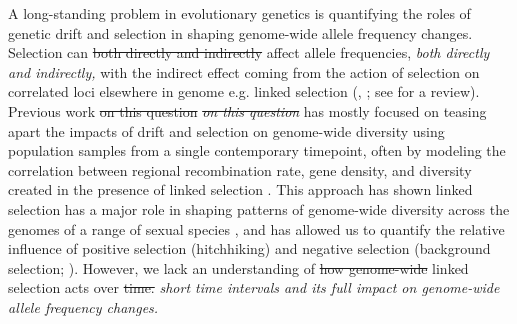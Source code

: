 \documentclass[11pt]{article}
\newcommand{\vb}[1]{{\it \color{blue} #1}}
\newcommand{\vbout}[1]{{\it \color{blue} \sout{#1}}}
\providecommand{\DIFaddtex}[1]{{\protect\color{blue}\uwave{#1}}} %
\providecommand{\DIFdeltex}[1]{{\protect\color{red}\sout{#1}}}                      %
\providecommand{\DIFaddbegin}{} %
\providecommand{\DIFaddend}{} %
\providecommand{\DIFdelbegin}{} %
\providecommand{\DIFdelend}{} %
\providecommand{\DIFadd}[1]{\texorpdfstring{\DIFaddtex{#1}}{#1}} %
\providecommand{\DIFdel}[1]{\texorpdfstring{\DIFdeltex{#1}}{}} %
\begin{document}
A long-standing problem in evolutionary genetics is quantifying the roles of
genetic drift and selection in shaping genome-wide allele frequency changes.
Selection can \DIFdelbegin \DIFdel{both directly and indirectly }\DIFdelend affect allele frequencies, \DIFaddbegin \vb{both directly and indirectly,}
\DIFaddend with the indirect effect coming from the action of selection on correlated
loci elsewhere in genome e.g. linked selection (\cite{Maynard_Smith1974-lc},
\cite{Charlesworth1993-gb,Nordborg1996-nq}; see \cite{Barton2000-zg} for a
review). Previous work \DIFdelbegin \DIFdel{on this question }\DIFdelend \DIFaddbegin \vbout{on this question} \DIFaddend has mostly focused on teasing
apart the impacts of drift and selection on genome-wide diversity using
population samples from a single contemporary timepoint, often by modeling the
correlation between regional recombination rate, gene density, and diversity
created in the presence of linked selection
\parencite{Cutter2013-ba,Sella2009-nx}. This approach has shown linked
selection has a major role in shaping patterns of genome-wide diversity across
the genomes of a range of sexual species
\parencite{Macpherson2007-qt,Andolfatto2007-uy,Begun2007-bg,Beissinger2016-cm,Sattath2011-dr,Williamson2014-oy,Andersen2012-bj,Cutter2010-gi,Elyashiv2016-vt},
and has allowed us to quantify the relative influence of positive selection
(hitchhiking) and negative selection (background selection;
\cite{Nordborg2005-dc,McVicker2009-ax,Andolfatto2007-uy,Macpherson2007-qt,Hernandez2011-gs,Elyashiv2016-vt}).
However, we lack an understanding of \DIFdelbegin \DIFdel{how genome-wide }\DIFdelend \DIFaddbegin \DIFadd{both how }\DIFaddend linked selection acts over
\DIFdelbegin \DIFdel{time.
}\DIFdelend \DIFaddbegin \vb{short time intervals and its full impact on genome-wide allele frequency
changes.}
\DIFaddend 
\end{document}
